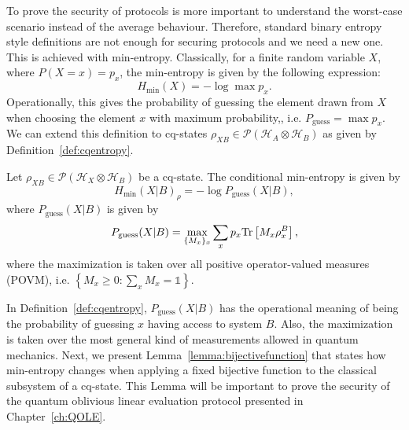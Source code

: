 To prove the security of protocols is more important to understand the worst-case scenario instead of the average behaviour. Therefore, standard binary entropy style definitions are not enough for securing protocols and we need a new one. This is achieved with min-entropy. Classically, for a finite random variable $X$, where $P(X=x) = p_x$, the min-entropy is given by the following expression:
$$H_{\min}(X) = -\log \max p_x.$$
Operationally, this gives the probability of guessing the element drawn from $X$ when choosing the element $x$ with maximum probability,, i.e. $P_{\text{guess}} = \max p_x$. We can extend this definition to cq-states $\rho_{XB}\in\mathcal{P}(\mathcal{H}_A \otimes \mathcal{H}_B)$ as given by Definition~\ref{def:cqentropy}.

\begin{definition}
\label{def:cqentropy}
Let $\rho_{X B}\in\mathcal{P}(\mathcal{H}_X \otimes \mathcal{H}_{B})$ be a cq-state. The conditional min-entropy is given by
$$H_{\min}(X|B)_{\rho} = -\log P_{\text{guess}}(X|B),$$
where $P_{\text{guess}}(X|B)$ is given by
$$P_{\text{guess}}(X|B) = \max_{\{M_x\}_x} \sum_x p_x \text{Tr}\left[M_x \rho_{x}^B\right],$$
where the maximization is taken over all positive operator-valued measures (POVM), i.e. $\left\{ M_x \geq 0 : \sum_x M_x = \mathds{1} \right\}$.
\end{definition}

In Definition~\ref{def:cqentropy}, $P_{\text{guess}}(X|B)$ has the operational meaning of being the probability of guessing $x$ having access to system $B$. Also, the maximization is taken over the most general kind of measurements allowed in quantum mechanics. Next, we present Lemma~\ref{lemma:bijectivefunction} that states how min-entropy changes when applying a fixed bijective function to the classical subsystem of a cq-state. This Lemma will be important to prove the security of the quantum oblivious linear evaluation protocol presented in Chapter~\ref{ch:QOLE}.

